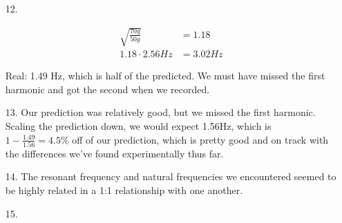 \documentclass[12pt, letterpaper]{article}
\begin{document}
\begin{itemize}
        \item [12.]
        
        \begin{align*}
            \sqrt{\frac{70g}{50g}}    & = 1.18    \\
            1.18 \cdot 2.56 Hz       & = 3.02 Hz
        \end{align*}

        Real: 1.49 Hz, which is half of the predicted. We must have missed the first harmonic and got the second when we recorded.

        \item [13.] Our prediction was relatively good, but we missed the first harmonic. Scaling the prediction down, we would expect 1.56Hz, which is $1 - \frac{1.49}{1.56} = 4.5\%$ off of our prediction, which is pretty good and on track with the differences we've found experimentally thus far.
        
        \item [14.] The resonant frequency and natural frequencies we encountered seemed to be highly related in a 1:1 relationship with one another.
        
        \item [15.] \mbox{}
        
        \begin{center}
        \end{center}

    \end{itemize}
    
\end{document}

